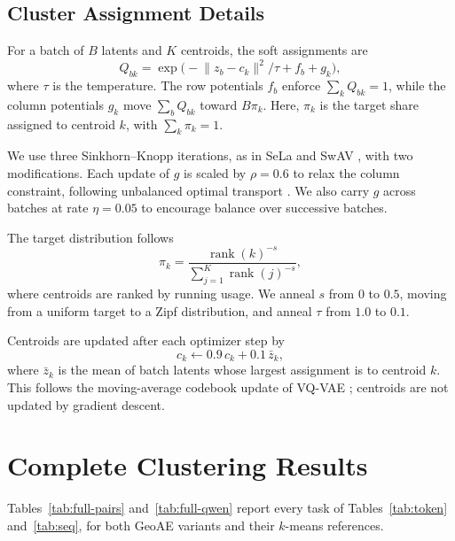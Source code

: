 \documentclass[11pt]{article}
\begin{document}
\subsection{Cluster Assignment Details}
\label{app:assignment}

For a batch of $B$ latents and $K$ centroids, the soft assignments are
\begin{equation}
  Q_{bk} = \exp\!\big(
    -\lVert z_b - c_k \rVert^2/\tau + f_b + g_k
  \big),
  \label{eq:assign}
\end{equation}
where $\tau$ is the temperature.
The row potentials $f_b$ enforce $\sum_k Q_{bk}=1$, while the
column potentials $g_k$ move $\sum_b Q_{bk}$ toward $B\pi_k$.
Here, $\pi_k$ is the target share assigned to centroid $k$,
with $\sum_k \pi_k=1$.

We use three Sinkhorn--Knopp iterations, as in SeLa and SwAV
\citep{asano2020sela,caron2020swav}, with two modifications.
Each update of $g$ is scaled by $\rho=0.6$ to relax the column
constraint, following unbalanced optimal transport
\citep{chizat2018scaling}.
We also carry $g$ across batches at rate $\eta=0.05$ to
encourage balance over successive batches.

The target distribution follows
\begin{equation}
  \pi_k =
  \frac{\operatorname{rank}(k)^{-s}}
       {\sum_{j=1}^{K}\operatorname{rank}(j)^{-s}},
\end{equation}
where centroids are ranked by running usage.
We anneal $s$ from $0$ to $0.5$, moving from a uniform target
to a Zipf distribution, and anneal $\tau$ from $1.0$ to $0.1$.

Centroids are updated after each optimizer step by
\begin{equation}
  c_k \leftarrow 0.9\,c_k + 0.1\,\bar{z}_k,
\end{equation}
where $\bar{z}_k$ is the mean of batch latents whose largest
assignment is to centroid $k$.
This follows the moving-average codebook update of VQ-VAE
\citep{vandenoord2017vqvae}; centroids are not updated by
gradient descent.
\section{Complete Clustering Results}
\label{app:full}

Tables~\ref{tab:full-pairs} and~\ref{tab:full-qwen} report every task of Tables~\ref{tab:token} and~\ref{tab:seq}, for both GeoAE variants and their $k$-means references.
\end{document}
